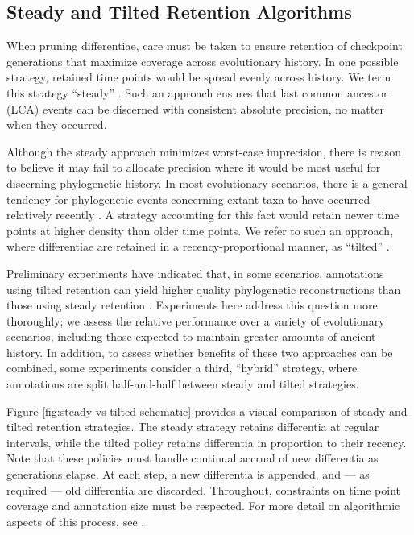 \subsection{Steady and Tilted Retention Algorithms}
\label{sec:methods-steady-vs-tilted-algorithms}



When pruning differentiae, care must be taken to ensure retention of checkpoint generations that maximize coverage across evolutionary history.
In one possible strategy, retained time points would be spread evenly across history.
We term this strategy ``steady'' \citep{han2005stream,zhao2005generalized}.
Such an approach ensures that last common ancestor (LCA) events can be discerned with consistent absolute precision, no matter when they occurred.

Although the steady approach minimizes worst-case imprecision, there is reason to believe it may fail to allocate precision where it would be most useful for discerning phylogenetic history.
In most evolutionary scenarios, there is a general tendency for phylogenetic events concerning extant taxa to have occurred relatively recently \citep{zhaxybayeva2004cladogenesis}.
A strategy accounting for this fact would retain newer time points at higher density than older time points.
We refer to such an approach, where differentiae are retained in a recency-proportional manner, as ``tilted'' \citep{han2005stream,zhao2005generalized}.

Preliminary experiments have indicated that, in some scenarios, annotations using tilted retention can yield higher quality phylogenetic reconstructions than those using steady retention \citep{moreno2022hereditary}.
Experiments here address this question more thoroughly; we assess the relative performance over a variety of evolutionary scenarios, including those expected to maintain greater amounts of ancient history.
In addition, to assess whether benefits of these two approaches can be combined, some experiments consider a third, ``hybrid'' strategy, where annotations are split half-and-half between steady and tilted strategies.

Figure \ref{fig:steady-vs-tilted-schematic} provides a visual comparison of steady and tilted retention strategies.
The steady strategy retains differentia at regular intervals, while the tilted policy retains differentia in proportion to their recency.
Note that these policies must handle continual accrual of new differentia as generations elapse.
At each step, a new differentia is appended, and --- as required --- old differentia are discarded.
Throughout, constraints on time point coverage and annotation size must be respected.
For more detail on algorithmic aspects of this process, see \citet{moreno2024algorithms,moreno2024structured}.


